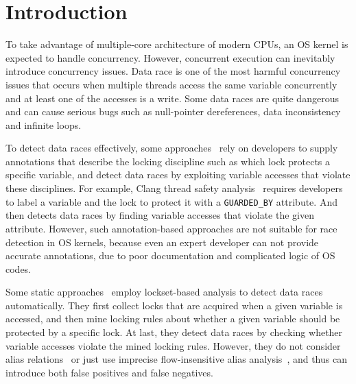 \section{Introduction}
\label{sec_introduction}

To take advantage of multiple-core architecture of modern CPUs, an OS kernel is 
expected to handle concurrency. However, concurrent execution can inevitably 
introduce concurrency issues. Data race is one of the most harmful concurrency 
issues that occurs when multiple threads access the same variable concurrently 
and at least one of the accesses is a write. Some data races are quite 
dangerous and can cause serious bugs such as null-pointer dereferences, data 
inconsistency and infinite loops.

To detect data races effectively, some approaches~\cite{Boyapati:OOPSLA02, 
Anderson:PLDI08, Anderson:PLDI09, Zhou:MICRO19, Flanagan:PASTE01, 
Flanagan:PLDI00, Sadowski:PLATEAU14, ClangThreadSafety, Blackshear:OOPSLA18} 
rely on developers to supply annotations that describe the locking discipline 
such as which lock protects a specific variable, and detect data races by 
exploiting variable accesses that violate these disciplines. For example, Clang 
thread safety analysis~\cite{ClangThreadSafety} requires developers to label a 
variable and the lock to protect it with a {\tt GUARDED\_BY} attribute. And 
then detects data races by finding variable accesses that violate the given 
attribute. However, such annotation-based approaches are not suitable for race 
detection in OS kernels, because even an expert developer can not provide 
accurate annotations, due to poor documentation and complicated logic of OS 
codes.

Some static approaches~\cite{Choi:PLDI02, Engler:SOSP03, Voung:FSE07, 
Pratikakis:PLDI06, Naik:PLDI06} employ lockset-based analysis to detect data 
races automatically. They first collect locks that are acquired when a given 
variable is accessed, and then mine locking rules about whether a given 
variable should be protected by a specific lock. At last, they detect data 
races by checking whether variable accesses violate the mined locking rules. 
However, they do not consider alias relations~\cite{Voung:FSE07, Engler:SOSP03} 
or just use imprecise flow-insensitive alias analysis~\cite{Choi:PLDI02, 
Pratikakis:PLDI06, Naik:PLDI06}, and thus can introduce both false positives 
and false negatives.


